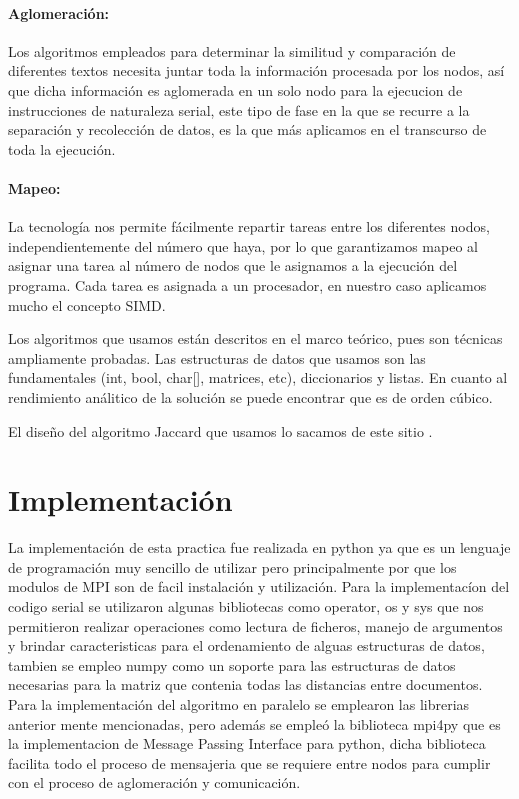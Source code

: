 \documentclass[fleqn,10pt]{SelfArx} %
\begin{document}
\paragraph{Aglomeración:}
Los algoritmos empleados para determinar la similitud y comparación de diferentes textos necesita juntar toda la información procesada por los nodos, así que dicha información es aglomerada en un solo nodo para la ejecucion de instrucciones de naturaleza serial, este tipo de fase en la que se recurre a la separación y recolección de datos, es la que más aplicamos en el transcurso de toda la ejecución.

\paragraph{Mapeo:}
La tecnología nos permite fácilmente repartir tareas entre los diferentes nodos, independientemente del número que haya, por lo que garantizamos mapeo al asignar una tarea al número de nodos que le asignamos a la ejecución del programa. Cada tarea es asignada a un procesador, en nuestro caso aplicamos mucho el concepto SIMD.

Los algoritmos que usamos están descritos en el marco teórico, pues son técnicas ampliamente probadas.
Las estructuras de datos que usamos son las fundamentales (int, bool, char[], matrices, etc), diccionarios y listas.
En cuanto al rendimiento análitico de la solución se puede encontrar que es de orden cúbico.

El diseño del algoritmo Jaccard que usamos lo sacamos de este sitio \cite{jaccard_seudo}. 

\section{Implementación}
La implementación de esta practica fue realizada en python ya que es un lenguaje de programación muy sencillo de utilizar pero principalmente por que los modulos de MPI son de facil instalación y utilización.
Para la implementacíon del codigo serial se utilizaron algunas bibliotecas como operator, os y sys que nos permitieron realizar operaciones como lectura de ficheros, manejo de argumentos y brindar caracteristicas para el ordenamiento de alguas estructuras de datos, tambien se empleo numpy como un soporte para las estructuras de datos necesarias para la matriz que contenia todas las distancias entre documentos.
Para la implementación del algoritmo en paralelo se emplearon las librerias anterior mente mencionadas, pero además se empleó la biblioteca mpi4py que es la implementacion de Message Passing Interface para python, dicha biblioteca facilita todo el proceso de mensajeria que se requiere entre nodos para cumplir con el proceso de aglomeración y comunicación.
\end{document}
